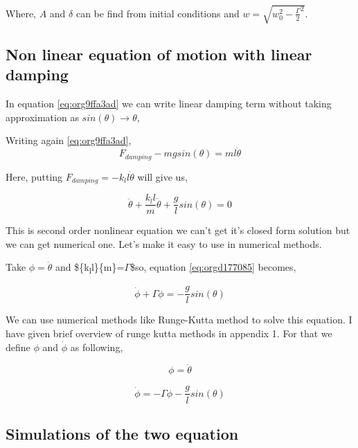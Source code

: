 \documentclass[11pt,a4paper]{article}
\begin{document}
Where, \(A\) and \(\delta\) can be find from initial conditions and \(w = \sqrt{w_{0}^{2}-\frac{\Gamma}{2}^{2}}\).

\subsection{Non linear equation of motion with linear damping}
\label{sec:orgeed83eb}

In equation \ref{eq:org9ffa3ad} we can write linear damping term without taking approximation as \(sin(\theta) \to \theta\),

Writing again \ref{eq:org9ffa3ad}, 
\begin{equation*}
\label{eq:org2de7a26}
F_{damping}-mgsin(\theta)=ml\ddot{\theta}
\end{equation*}

Here, putting \(F_{damping}=-k_{l}l\dot{\theta}\) will give us,

\begin{equation}
\label{eq:orgd177085}
\ddot{\theta}+\frac{k_{l}l}{m}\dot{\theta}+\frac{g}{l}sin(\theta)=0
\end{equation}

This is second order nonlinear equation we can't get it's closed form solution but we can get numerical one. Let's make it easy to use in numerical methods.

Take \(\phi = \dot{\theta}\) and \$\frac\{k\textsubscript{l}l\}\{m\}=\(\Gamma\)\$so, equation \ref{eq:orgd177085} becomes,

\begin{equation}
\label{eq:org16e2d0c}
\dot{\phi}+\Gamma\phi=-\frac{g}{l} sin(\theta)
\end{equation}

We can use numerical methods like Runge-Kutta method to solve this equation. I have given brief overview of runge kutta methods in appendix 1. For that we define \(\phi\) and \(\dot{\phi}\) as following,

\begin{equation}
\label{eq:org77ee4f6}
\phi=\dot{\theta}
\end{equation}

\begin{equation}
\label{eq:orgeef4963}
\dot{\phi}=-\Gamma\phi-\frac{g}{l} sin(\theta)
\end{equation}



\subsection{Simulations of the two equation}
\label{sec:org4ab607b}
\end{document}

